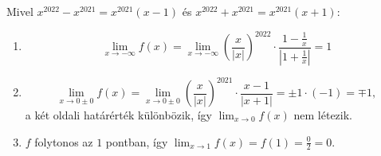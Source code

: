 \documentclass[11pt]{scrartcl}
\begin{document}
Mivel $x^{2022} - x^{2021} = x^{2021} (x - 1)$ és
$x^{2022} + x^{2021} = x^{2021} (x + 1)$:
\begin{enumerate}
	\item \[
		      \lim_{x \to -\infty} f(x)
		      = \lim_{x \to -\infty}
		      \left( \frac{x}{|x|} \right)^{2022} \cdot
		      \frac{1 - \frac{1}{x}}{\left| 1 + \frac{1}{x} \right|}
		      = 1
	      \]

	\item \[
		      \lim_{x \to 0 \pm 0} f(x)
		      = \lim_{x \to 0 \pm 0}
		      \left( \frac{x}{|x|} \right)^{2021} \cdot
		      \frac{x - 1}{|x + 1|}
		      = \pm 1 \cdot (-1)
		      = \mp 1,
	      \]
	      a két oldali határérték különbözik, így $\lim_{x \to 0} f(x)$ nem
	      létezik.

	\item $f$ folytonos az $1$ pontban, így
	      \(
	      \lim_{x \to 1} f(x) = f(1) = \frac{0}{2} = 0
	      \).
\end{enumerate}
\end{document}
